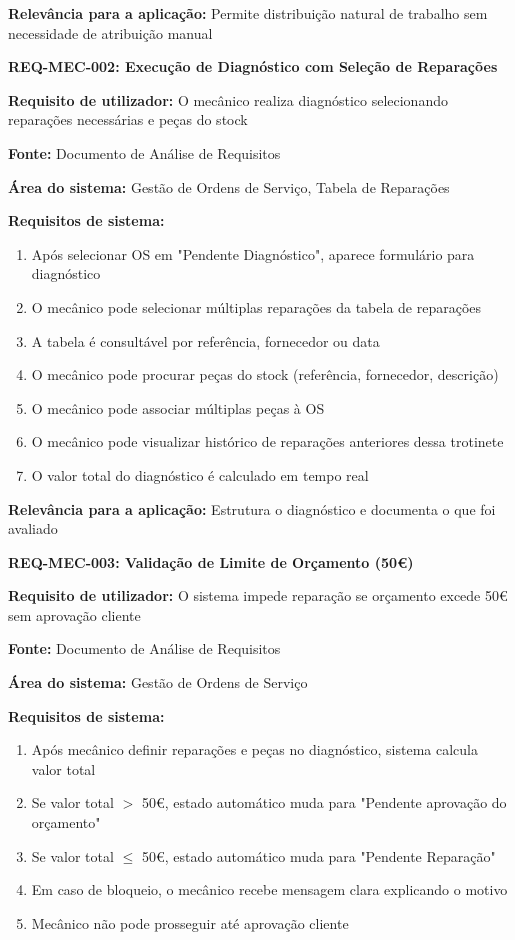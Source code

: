 \documentclass[11pt,a4paper]{article}
\newcommand{\reqheader}[1]{{\noindent\large\bfseries\color{sectionblue}#1}\par\vspace{0.3cm}}
\newcommand{\reqfield}[2]{{\noindent\textbf{#1:} #2}\par\vspace{0.2cm}}
\begin{document}
\reqfield{Relevância para a aplicação}{Permite distribuição natural de trabalho sem necessidade de atribuição manual}

\vspace{0.8cm}

\reqheader{REQ-MEC-002: Execução de Diagnóstico com Seleção de Reparações}

\reqfield{Requisito de utilizador}{O mecânico realiza diagnóstico selecionando reparações necessárias e peças do stock}

\reqfield{Fonte}{Documento de Análise de Requisitos}

\reqfield{Área do sistema}{Gestão de Ordens de Serviço, Tabela de Reparações}

\reqfield{Requisitos de sistema}{
	\begin{enumerate}
		\item Após selecionar OS em "Pendente Diagnóstico", aparece formulário para diagnóstico
		\item O mecânico pode selecionar múltiplas reparações da tabela de reparações
		\item A tabela é consultável por referência, fornecedor ou data
		\item O mecânico pode procurar peças do stock (referência, fornecedor, descrição)
		\item O mecânico pode associar múltiplas peças à OS
		\item O mecânico pode visualizar histórico de reparações anteriores dessa trotinete
		\item O valor total do diagnóstico é calculado em tempo real
	\end{enumerate}
}

\reqfield{Relevância para a aplicação}{Estrutura o diagnóstico e documenta o que foi avaliado}

\vspace{0.8cm}

\reqheader{REQ-MEC-003: Validação de Limite de Orçamento (50€)}

\reqfield{Requisito de utilizador}{O sistema impede reparação se orçamento excede 50€ sem aprovação cliente}

\reqfield{Fonte}{Documento de Análise de Requisitos}

\reqfield{Área do sistema}{Gestão de Ordens de Serviço}

\reqfield{Requisitos de sistema}{
	\begin{enumerate}
		\item Após mecânico definir reparações e peças no diagnóstico, sistema calcula valor total
		\item Se valor total $>$ 50€, estado automático muda para "Pendente aprovação do orçamento"
		\item Se valor total $\le$ 50€, estado automático muda para "Pendente Reparação"
		\item Em caso de bloqueio, o mecânico recebe mensagem clara explicando o motivo
		\item Mecânico não pode prosseguir até aprovação cliente
	\end{enumerate}
}
\end{document}
